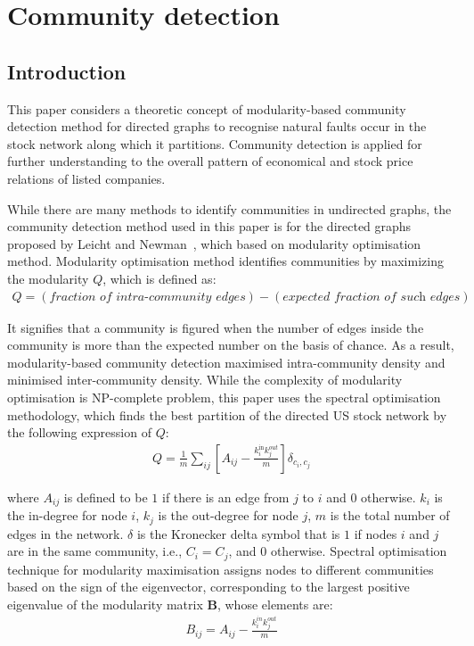 \chapter{Community detection}
\section{Introduction}
This paper considers a theoretic concept of modularity-based community detection method for directed graphs to recognise natural faults occur in the stock network along which it partitions. Community detection is applied for further understanding to the overall pattern of economical and stock price relations of listed companies.

While there are many methods to identify communities in undirected graphs, the community detection method used in this paper is for the directed graphs proposed by Leicht and Newman~\cite{PhysRevLett.100.118703}, which based on modularity optimisation method. Modularity optimisation method identifies communities by maximizing the modularity $Q$, which is defined as:
\begin{eqnarray}
Q=(\textit{fraction of intra-community edges}) - (\textit{expected fraction of such edges})
\end{eqnarray}

It signifies that a community is figured when the number of edges inside the community is more than the expected number on the basis of chance. As a result, modularity-based community detection maximised intra-community density and minimised inter-community density. While the complexity of modularity optimisation is NP-complete problem, this paper uses the spectral optimisation methodology, which finds the best partition of the directed US stock network by the following expression of $Q$:
\begin{eqnarray}
Q=\frac{1}{m}\sum_{ij}{\left[A_{ij}-\frac{k_i^{\text{in}}k_j^{out}}{m}\right]}\delta_{c_i,c_j}
\end{eqnarray}

where $A_{ij}$ is defined to be $1$ if there is an edge from $j$ to $i$ and $0$ otherwise. $k_i$ is the in-degree for node $i$, $k_j$ is the out-degree for node $j$, $m$ is the total number of edges in the network. $\delta$ is the Kronecker delta symbol that is $1$ if nodes $i$ and $j$ are in the same community, i.e., $C_i=C_j$, and $0$ otherwise. Spectral optimisation technique for modularity maximisation assigns nodes to different communities based on the sign of the eigenvector, corresponding to the largest positive eigenvalue of the modularity matrix \textbf{B}, whose elements are:
\begin{eqnarray}
B_{ij}=A_{ij}-\frac{k_i^{in}k_j^{out}}{m}
\end{eqnarray}

